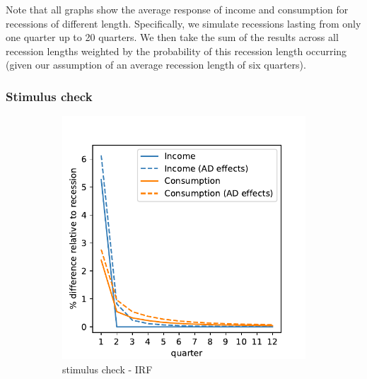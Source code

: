 Note that all graphs show the average response of income and consumption for recessions of different length.
Specifically, we simulate recessions lasting from only one quarter up to 20 quarters.
We then take the sum of the results across all recession lengths weighted by the probability of this recession length occurring (given our assumption of an average recession length of six quarters).

\subsubsection{Stimulus check} 



\begin{figure}[htb]
	\centering
	\begin{subfigure}[b]{.33\linewidth}
		\centering
		\includegraphics[width=\linewidth]{text/chapter3/Code/HA-Models/FromPandemicCode/Figures/recession_Check_relrecession}
		\caption{stimulus check - IRF}
		\label{fig:recessioncheckrelrecession}
	\end{subfigure}%
	\begin{subfigure}[b]{.33\linewidth}
		\centering

\end{subfigure}
\end{figure}
